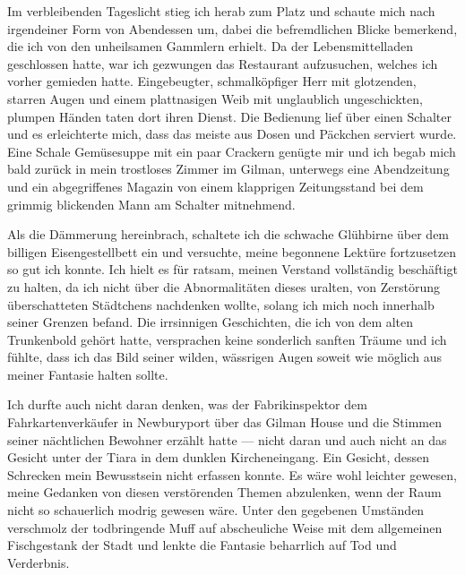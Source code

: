 Im verbleibenden Tageslicht stieg ich herab zum Platz und schaute mich nach irgendeiner Form von Abendessen um, dabei die befremdlichen Blicke bemerkend, die ich von den unheilsamen Gammlern erhielt. Da der Lebensmittelladen geschlossen hatte, war ich gezwungen das Restaurant aufzusuchen, welches ich vorher gemieden hatte. Eingebeugter, schmalköpfiger Herr mit glotzenden, starren Augen und einem plattnasigen Weib mit unglaublich ungeschickten, plumpen Händen taten dort ihren Dienst. Die Bedienung lief über einen Schalter und es erleichterte mich, dass das meiste aus Dosen und Päckchen serviert wurde. Eine Schale Gemüsesuppe mit ein paar Crackern genügte mir und ich begab mich bald zurück in mein trostloses Zimmer im Gilman, unterwegs eine Abendzeitung und ein abgegriffenes Magazin von einem klapprigen Zeitungsstand bei dem grimmig blickenden Mann am Schalter mitnehmend.

Als die Dämmerung hereinbrach, schaltete ich die schwache Glühbirne über dem billigen Eisengestellbett ein und versuchte, meine begonnene Lektüre fortzusetzen so gut ich konnte. Ich hielt es für ratsam, meinen Verstand vollständig beschäftigt zu halten, da ich nicht über die Abnormalitäten dieses uralten, von Zerstörung überschatteten Städtchens nachdenken wollte, solang ich mich noch innerhalb seiner Grenzen befand. Die irrsinnigen Geschichten, die ich von dem alten Trunkenbold gehört hatte, versprachen keine sonderlich sanften Träume und ich fühlte, dass ich das Bild seiner wilden, wässrigen Augen soweit wie möglich aus meiner Fantasie halten sollte.

Ich durfte auch nicht daran denken, was der Fabrikinspektor dem Fahrkartenverkäufer in Newburyport über das Gilman House und die Stimmen seiner nächtlichen Bewohner erzählt hatte --- nicht daran und auch nicht an das Gesicht unter der Tiara in dem dunklen Kircheneingang. Ein Gesicht, dessen Schrecken mein Bewusstsein nicht erfassen konnte. Es wäre wohl leichter gewesen, meine Gedanken von diesen verstörenden Themen abzulenken, wenn der Raum nicht so schauerlich modrig gewesen wäre. Unter den gegebenen Umständen verschmolz der todbringende Muff auf abscheuliche Weise mit dem allgemeinen Fischgestank der Stadt und lenkte die Fantasie beharrlich auf Tod und Verderbnis.

